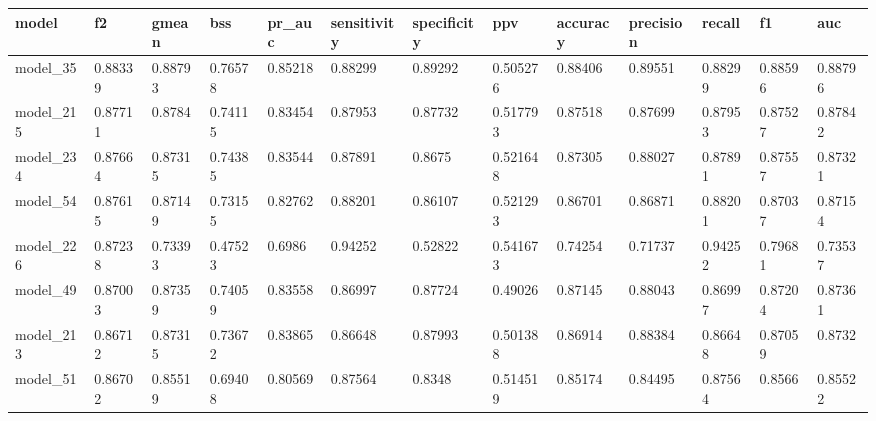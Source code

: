 \begin{tabular}{|l|l|l|l|l|l|l|l|l|l|l|l|l|}
\hline
\textbf{model} & \textbf{f2} & \textbf{gmean} & \textbf{bss} & \textbf{pr\_auc} & \textbf{sensitivity} & \textbf{specificity} & \textbf{ppv} & \textbf{accuracy} & \textbf{precision} & \textbf{recall} & \textbf{f1} & \textbf{auc} \\ \hline
model\_35      & 0.88339     & 0.88793        & 0.76578      & 0.85218          & 0.88299              & 0.89292              & 0.505276     & 0.88406           & 0.89551            & 0.88299         & 0.88596     & 0.88796      \\ \hline
model\_215     & 0.87711     & 0.8784         & 0.74115      & 0.83454          & 0.87953              & 0.87732              & 0.517793     & 0.87518           & 0.87699            & 0.87953         & 0.87527     & 0.87842      \\ \hline
model\_234     & 0.87664     & 0.87315        & 0.74385      & 0.83544          & 0.87891              & 0.8675               & 0.521648     & 0.87305           & 0.88027            & 0.87891         & 0.87557     & 0.87321      \\ \hline
model\_54      & 0.87615     & 0.87149        & 0.73155      & 0.82762          & 0.88201              & 0.86107              & 0.521293     & 0.86701           & 0.86871            & 0.88201         & 0.87037     & 0.87154      \\ \hline
model\_226     & 0.87238     & 0.73393        & 0.47523      & 0.6986           & 0.94252              & 0.52822              & 0.541673     & 0.74254           & 0.71737            & 0.94252         & 0.79681     & 0.73537      \\ \hline
model\_49      & 0.87003     & 0.87359        & 0.74059      & 0.83558          & 0.86997              & 0.87724              & 0.49026      & 0.87145           & 0.88043            & 0.86997         & 0.87204     & 0.87361      \\ \hline
model\_213     & 0.86712     & 0.87315        & 0.73672      & 0.83865          & 0.86648              & 0.87993              & 0.501388     & 0.86914           & 0.88384            & 0.86648         & 0.87059     & 0.8732       \\ \hline
model\_51      & 0.86702     & 0.85519        & 0.69408      & 0.80569          & 0.87564              & 0.8348               & 0.514519     & 0.85174           & 0.84495            & 0.87564         & 0.8566      & 0.85522      \\ \hline

\end{tabular}
